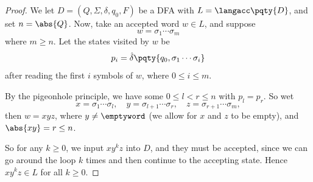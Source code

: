 \begin{proof}
    We let \(D = (Q, \Sigma, \delta, q_0, F)\) be a DFA with \(L = \langacc\pqty{D}\), and set \(n = \abs{Q}\). Now, take an accepted word \(w \in L\), and suppose
    \[
        w = \sigma_1 \cdots \sigma_m
    \]
    where \(m \geq n\). Let the states visited by \(w\) be
    \[
        p_i = \hat{\delta} \pqty{q_0, \sigma_1 \cdots \sigma_i}
    \]
    after reading the first \(i\) symbols of \(w\), where \(0 \leq i \leq m\).

    By the pigeonhole principle, we have some \(0 \leq l < r \leq n\) with \(p_l = p_r\). So wet
    \[
        x = \sigma_1 \cdots \sigma_l, \quad y = \sigma_{l + 1} \cdots \sigma_r, \quad z = \sigma_{r + 1} \cdots \sigma_m,
    \]
    then \(w = xyz\), where \(y \neq \emptyword\) (we allow for \(x\) and \(z\) to be empty), and \(\abs{xy} = r \leq n\).

    \begin{center}
    \end{center}

    So for any \(k \geq 0\), we input \(x y^k z\) into \(D\), and they must be accepted, since we can go around the loop \(k\) times and then continue to the accepting state. Hence \(xy^k z \in L\) for all \(k \geq 0\).
\end{proof}

